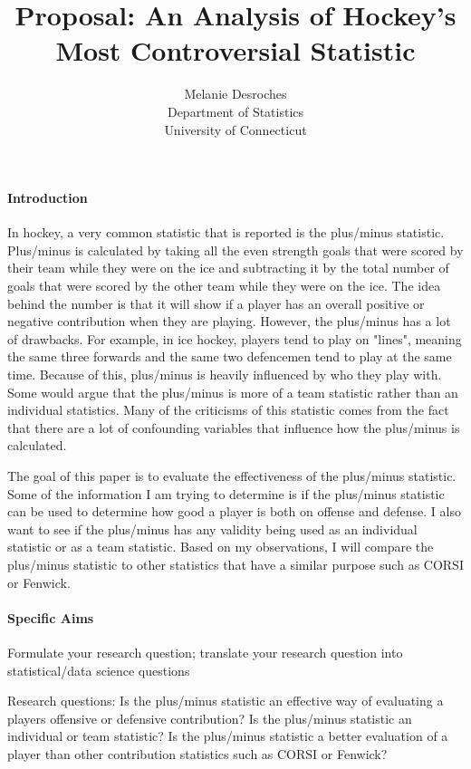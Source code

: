 \documentclass[12pt]{article}
\title{Proposal: An Analysis of Hockey's Most Controversial Statistic}
\author{Melanie Desroches\\
  Department of Statistics\\
  University of Connecticut
}
\begin{document}
\maketitle


\paragraph{Introduction}
In hockey, a very common statistic that is reported is the plus/minus statistic. Plus/minus is calculated
by taking all the even strength goals that were scored by their team while they were on the ice and subtracting
it by the total number of goals that were scored by the other team while they were on the ice. The idea behind 
the number is that it will show if a player has an overall positive or negative contribution when they are playing. 
However, the plus/minus has a lot of drawbacks. For example, in ice hockey, players tend to play on "lines", meaning 
the same three forwards and the same two defencemen tend to play at the same time. Because of this, plus/minus is heavily 
influenced by who they play with. Some would argue that the plus/minus is more of a team statistic rather than an 
individual statistics. Many of the criticisms of this statistic comes from the fact that there are a lot of confounding 
variables that influence how the plus/minus is calculated. 

The goal of this paper is to evaluate the effectiveness of the plus/minus statistic. Some of the information
I am trying to determine is if the plus/minus statistic can be used to determine how good a player is both on
offense and defense. I also want to see if the plus/minus has any validity being used as an individual
statistic or as a team statistic. Based on my observations, I will compare the plus/minus statistic to other
statistics that have a similar purpose such as CORSI or Fenwick.

\paragraph{Specific Aims}
Formulate your research question;
translate your research question into statistical/data science questions

Research questions:
Is the plus/minus statistic an effective way of evaluating a players offensive or defensive
contribution?
Is the plus/minus statistic an individual or team statistic?
Is the plus/minus statistic a better evaluation of a player than other contribution statistics
such as CORSI or Fenwick?
\end{document}
